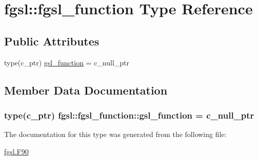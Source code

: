\hypertarget{structfgsl_1_1fgsl__function}{}\section{fgsl\+:\+:fgsl\+\_\+function Type Reference}
\label{structfgsl_1_1fgsl__function}
\subsection*{Public Attributes}
\begin{DoxyCompactItemize}
\item 
type(c\+\_\+ptr) \hyperlink{structfgsl_1_1fgsl__function_af51a7fb8249a2737a6799d55f7c08960}{gsl\+\_\+function} = c\+\_\+null\+\_\+ptr
\end{DoxyCompactItemize}


\subsection{Member Data Documentation}
\hypertarget{structfgsl_1_1fgsl__function_af51a7fb8249a2737a6799d55f7c08960}{}
\subsubsection[{gsl\+\_\+function}]{\setlength{\rightskip}{0pt plus 5cm}type(c\+\_\+ptr) fgsl\+::fgsl\+\_\+function\+::gsl\+\_\+function = c\+\_\+null\+\_\+ptr}\label{structfgsl_1_1fgsl__function_af51a7fb8249a2737a6799d55f7c08960}


The documentation for this type was generated from the following file\+:\begin{DoxyCompactItemize}
\item 
\hyperlink{fgsl_8F90}{fgsl.\+F90}\end{DoxyCompactItemize}
